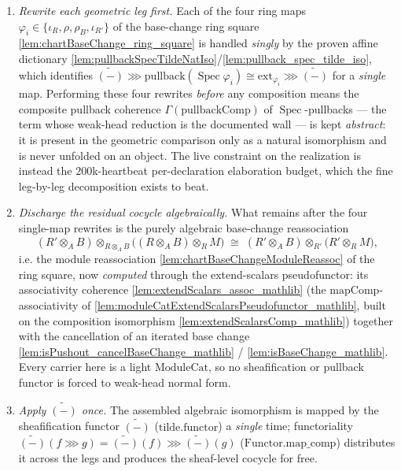 \begin{enumerate}
  \item \emph{Rewrite each geometric leg first.} Each of the four ring maps
    \(\varphi_i \in \{\iota_R,\rho,\rho_B,\iota_{R'}\}\) of the base-change ring square
    \cref{lem:chartBaseChange_ring_square} is handled \emph{singly} by the proven affine dictionary
    \cref{lem:pullbackSpecTildeNatIso}/\cref{lem:pullback_spec_tilde_iso}, which identifies
    \(\widetilde{(-)} \ggg \mathrm{pullback}(\operatorname{Spec}\varphi_i) \cong
    \mathrm{ext}_{\varphi_i} \ggg \widetilde{(-)}\) for a \emph{single} map. Performing these four
    rewrites \emph{before} any composition means the composite pullback coherence
    \(\Gamma(\mathrm{pullbackComp})\) of \(\operatorname{Spec}\)-pullbacks — the term whose weak-head
    reduction is the documented wall — is kept \emph{abstract}: it is present in the geometric
    comparison only as a natural isomorphism and is never unfolded on an object. The live constraint on
    the realization is instead the \(200\)k-heartbeat per-declaration elaboration budget, which the fine
    leg-by-leg decomposition exists to beat.
  \item \emph{Discharge the residual cocycle algebraically.} What remains after the four single-map
    rewrites is the purely algebraic base-change reassociation
    \[
      (R'\otimes_A B) \otimes_{R\otimes_A B}\bigl((R\otimes_A B)\otimes_R M\bigr)
        \;\cong\;
      (R'\otimes_A B) \otimes_{R'}\bigl(R'\otimes_R M\bigr),
    \]
    i.e. the module reassociation \cref{lem:chartBaseChangeModuleReassoc} of the ring square, now
    \emph{computed} through the extend-scalars pseudofunctor: its associativity coherence
    \cref{lem:extendScalars_assoc_mathlib} (the \(\mathrm{mapComp}\)-associativity of
    \cref{lem:moduleCatExtendScalarsPseudofunctor_mathlib}, built on the composition isomorphism
    \cref{lem:extendScalarsComp_mathlib}) together with the cancellation of an iterated base change
    \cref{lem:isPushout_cancelBaseChange_mathlib} / \cref{lem:isBaseChange_mathlib}. Every carrier
    here is a light \(\mathrm{ModuleCat}\), so no sheafification or pullback functor is forced to
    weak-head normal form.
  \item \emph{Apply \(\widetilde{(-)}\) once.} The assembled algebraic isomorphism is mapped by the
    sheafification functor \(\widetilde{(-)}\) (\(\mathrm{tilde.functor}\)) a \emph{single} time;
    functoriality \(\widetilde{(-)}(f \ggg g) = \widetilde{(-)}(f) \ggg \widetilde{(-)}(g)\)
    (\(\mathrm{Functor.map\_comp}\)) distributes it across the legs and produces the sheaf-level
    cocycle for free.
\end{enumerate}

